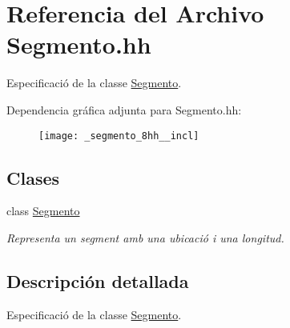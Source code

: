 \hypertarget{_segmento_8hh}{}\section{Referencia del Archivo Segmento.\+hh}
\label{_segmento_8hh}


Especificació de la classe \hyperlink{class_segmento}{Segmento}.  


Dependencia gráfica adjunta para Segmento.\+hh\+:\nopagebreak
\begin{figure}[H]
\begin{center}
\leavevmode
\texttt{[image: \_segmento\_8hh\_\_incl]}
\end{center}
\end{figure}
\subsection*{Clases}
\begin{DoxyCompactItemize}
\item 
class \hyperlink{class_segmento}{Segmento}
\begin{DoxyCompactList}\small\item\em Representa un segment amb una ubicació i una longitud. \end{DoxyCompactList}\end{DoxyCompactItemize}


\subsection{Descripción detallada}
Especificació de la classe \hyperlink{class_segmento}{Segmento}. 

